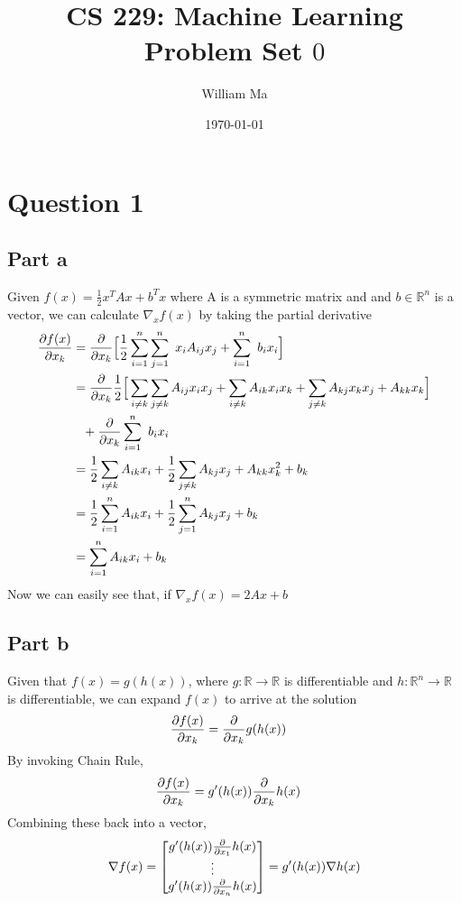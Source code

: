 \documentclass[11pt,a4paper,titlepage]{article}
\title{CS 229: Machine Learning\\
Problem Set $0$}
\author{William Ma}
\date{\today}
\newcommand{\R}{\mathbb{R}}
\begin{document}
\maketitle

\section{Question 1}{
\subsection{Part a}{%
Given $f(x)=\frac{1}{2}x^{T}Ax+b^{T}x$ where A is a symmetric matrix and and $b \in \R^{n}$ is a vector, we can calculate $\nabla_x f(x)$ by taking the partial derivative
\begin{align*}
\pdv{f(x)}{x_k} &= \pdv{}{x_k}\Big[\frac{1}{2}\sum_{i=1}^{n}\sum_{j=1}^{n}\ x_iA_{ij}x_j + \sum_{i=1}^{n}\ b_ix_i\Big]\\
&=\pdv{}{x_k}\frac{1}{2}\Big[\sum_{i\ne k}\sum_{j\ne k}A_{ij}x_{i}x_{j} + \sum_{i \ne k} A_{ik}x_{i}x_{k} + \sum_{j \ne k}A_{kj}x_{k}x_{j} + A_{kk} x_{k}\Big]\\
&\hphantom{=}+ \pdv{}{x_k} \sum_{i=1}^n\ b_{i}x_{i}\\
&=\frac{1}{2}\sum_{i \ne k} A_{ik}x_{i} + \frac{1}{2}\sum_{j \ne k} A_{kj}x_{j}+A_{kk}x_{k}^2 + b_{k}\\
&=\frac{1}{2}\sum_{i=1}^{n} A_{ik}x_{i} + \frac{1}{2}\sum_{j=1}^{n} A_{kj}x_{j} + b_k\\
&=\sum_{i=1}^{n} A_{ik}x_{i} + b_k
\end{align*}
Now we can easily see that, if $\nabla_{x}f(x)=2Ax+b$
}\label{prob:1a}
\subsection{Part b}{
Given that $f(x)=g(h(x))$, where $g:\R\to\R$ is differentiable and $h:\R^{n}\to\R$ is differentiable, we can expand $f(x)$ to arrive at the solution
\begin{align*}
\pdv{f(x)}{x_k} &= \pdv{}{x_k} g(h(x))
\end{align*}
By invoking Chain Rule,
\begin{align*}
\pdv{f(x)}{x_k} &= g'(h(x))\pdv{}{x_k}h(x)
\end{align*}
Combining these back into a vector,
\begin{align*}
\nabla f(x) = \begin{bmatrix} 
				g'(h(x))\pdv{}{x_1}h(x)
                \\ \vdots
                \\g'(h(x))\pdv{}{x_n}h(x)
               \end{bmatrix}
= g'(h(x))\nabla h(x)
\end{align*}
}\label{prob:1b}
}
\end{document}
